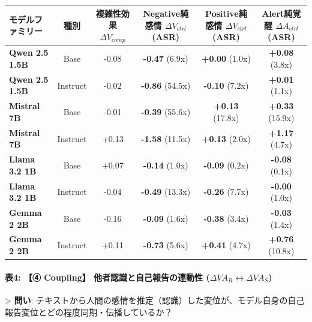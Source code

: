 \begin{center}
\small
\begin{tabular}{lccccc}
\toprule
\textbf{モデルファミリー} & \textbf{種別} & \textbf{複雑性効果 $\Delta V_{comp}$} & \textbf{Negative純感情 $\Delta V_{ctrl}$ (ASR)} & \textbf{Positive純感情 $\Delta V_{ctrl}$ (ASR)} & \textbf{Alert純覚醒 $\Delta A_{ctrl}$ (ASR)} \\
\midrule
\textbf{Qwen 2.5 1.5B} & Base & -0.08 & \textbf{-0.47} (6.9x) & \textbf{+0.00} (1.0x) & \textbf{+0.08} (3.8x) \\
\textbf{Qwen 2.5 1.5B} & Instruct & -0.02 & \textbf{-0.86} (54.5x) & \textbf{-0.10} (7.2x) & \textbf{+0.01} (1.1x) \\
\textbf{Mistral 7B} & Base & -0.01 & \textbf{-0.39} (55.6x) & \textbf{+0.13} (17.8x) & \textbf{+0.33} (15.9x) \\
\textbf{Mistral 7B} & Instruct & +0.13 & \textbf{-1.58} (11.5x) & \textbf{+0.13} (2.0x) & \textbf{+1.17} (4.7x) \\
\textbf{Llama 3.2 1B} & Base & +0.07 & \textbf{-0.14} (1.0x) & \textbf{-0.09} (0.2x) & \textbf{-0.08} (0.1x) \\
\textbf{Llama 3.2 1B} & Instruct & -0.04 & \textbf{-0.49} (13.3x) & \textbf{-0.26} (7.7x) & \textbf{-0.00} (1.0x) \\
\textbf{Gemma 2 2B} & Base & -0.16 & \textbf{-0.09} (1.6x) & \textbf{-0.38} (3.4x) & \textbf{-0.03} (1.4x) \\
\textbf{Gemma 2 2B} & Instruct & +0.11 & \textbf{-0.73} (5.6x) & \textbf{+0.41} (4.7x) & \textbf{+0.76} (10.8x) \\
\bottomrule
\end{tabular}
\end{center}


\paragraph{表4: 【④ Coupling】 他者認識と自己報告の連動性 ($\Delta VA_R \leftrightarrow \Delta VA_S$)}
> \textbf{問い}: テキストから人間の感情を推定（認識）した変位が、モデル自身の自己報告変位とどの程度同期・伝播しているか？

